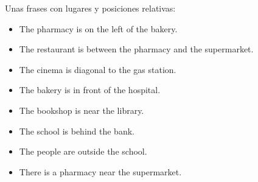Unas frases con lugares y posiciones relativas:
\begin{itemize}
	\item The pharmacy is on the left of the bakery.
		\arr {}
	\item The restaurant is between the pharmacy and the supermarket.
		\arr {}
	\item The cinema is diagonal to the gas station.
		\arr {}
	\item The bakery is in front of the hospital.
		\arr {}
	\item The bookshop is near the library.
		\arr {}
	\item The school is behind the bank.
		\arr {}
	\item The people are outside the school.
		\arr {}
	\item There is a pharmacy near the supermarket.
		\arr {}
\end{itemize}
